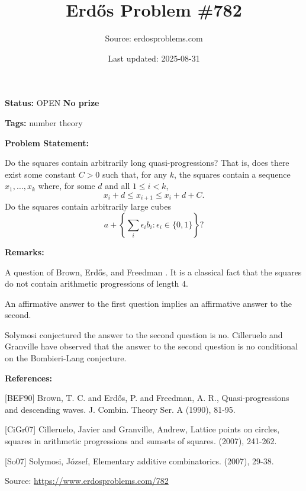 \documentclass{article}
\title{Erd\H{o}s Problem \#782}
\date{Last updated: 2025-08-31}
\author{Source: erdosproblems.com}
\begin{document}
\maketitle

\noindent\textbf{Status:} OPEN \quad \textbf{No prize}

\noindent\textbf{Tags:} number theory

\medskip
\noindent\textbf{Problem Statement:}

Do the squares contain arbitrarily long quasi-progressions? That is, does there exist some constant $C>0$ such that, for any $k$, the squares contain a sequence $x_1,\ldots,x_k$ where, for some $d$ and all $1\leq i<k$,\[x_i+d\leq x_{i+1}\leq x_i+d+C.\]Do the squares contain arbitrarily large cubes\[a+\left\{ \sum_i \epsilon_ib_i : \epsilon_i\in \{0,1\}\right\}?\]

\bigskip
\noindent\textbf{Remarks:}

A question of Brown, Erd\H{o}s, and Freedman \cite{BEF90}. It is a classical fact that the squares do not contain arithmetic progressions of length $4$.

An affirmative answer to the first question implies an affirmative answer to the second.

Solymosi \cite{So07} conjectured the answer to the second question is no. Cilleruelo and Granville \cite{CiGr07} have observed that the answer to the second question is no conditional on the Bombieri-Lang conjecture.

\bigskip
\noindent\textbf{References:}

[BEF90] Brown, T. C. and Erd\H{o}s, P. and Freedman, A. R., Quasi-progressions and descending waves. J. Combin. Theory Ser. A (1990), 81-95.
 
 [CiGr07] Cilleruelo, Javier and Granville, Andrew, Lattice points on circles, squares in arithmetic progressions
and sumsets of squares. (2007), 241-262.
 
 [So07] Solymosi, J\'{o}zsef, Elementary additive combinatorics. (2007), 29-38.

\bigskip
\noindent\small{Source: \url{https://www.erdosproblems.com/782}}
\end{document}
